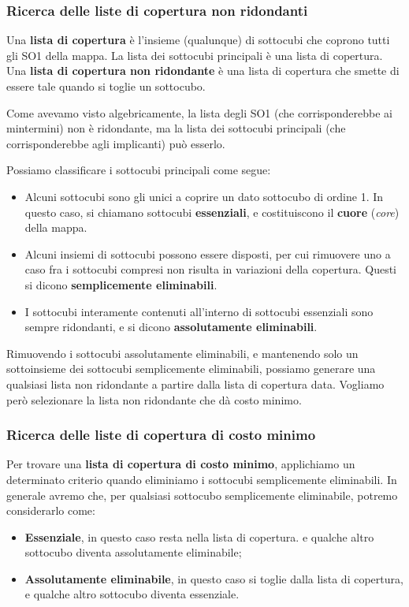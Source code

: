 \documentclass[a4paper,11pt]{article}
\begin{document}
\subsubsection{Ricerca delle liste di copertura non ridondanti}
Una \textbf{lista di copertura} è l'insieme (qualunque) di sottocubi che coprono tutti gli SO1 della mappa.
La lista dei sottocubi principali è una lista di copertura.
Una \textbf{lista di copertura non ridondante} è una lista di copertura che smette di essere tale quando si toglie un sottocubo.

Come avevamo visto algebricamente, la lista degli SO1 (che corrisponderebbe ai mintermini) non è ridondante, ma la lista dei sottocubi principali (che corrisponderebbe agli implicanti) può esserlo.

Possiamo classificare i sottocubi principali come segue:
\begin{itemize}
	\item Alcuni sottocubi sono gli unici a coprire un dato sottocubo di ordine 1. In questo caso, si chiamano sottocubi \textbf{essenziali}, e costituiscono il \textbf{cuore} (\textit{core}) della mappa.
	\item Alcuni insiemi di sottocubi possono essere disposti, per cui rimuovere uno a caso fra i sottocubi compresi non risulta in variazioni della copertura. Questi si dicono \textbf{semplicemente eliminabili}.
	\item I sottocubi interamente contenuti all'interno di sottocubi essenziali sono sempre ridondanti, e si dicono \textbf{assolutamente eliminabili}.
\end{itemize}

Rimuovendo i sottocubi assolutamente eliminabili, e mantenendo solo un sottoinsieme dei sottocubi semplicemente eliminabili, possiamo generare una qualsiasi lista non ridondante a partire dalla lista di copertura data.
Vogliamo però selezionare la lista non ridondante che dà costo minimo.

\subsubsection{Ricerca delle liste di copertura di costo minimo}
Per trovare una \textbf{lista di copertura di costo minimo}, applichiamo un determinato criterio quando eliminiamo i sottocubi semplicemente eliminabili.
In generale avremo che, per qualsiasi sottocubo semplicemente eliminabile, potremo considerarlo come:
\begin{itemize}
	\item \textbf{Essenziale}, in questo caso resta nella lista di copertura. e qualche altro sottocubo diventa assolutamente eliminabile;
	\item \textbf{Assolutamente eliminabile}, in questo caso si toglie dalla lista di copertura, e qualche altro sottocubo diventa essenziale.
\end{itemize}
\end{document}
